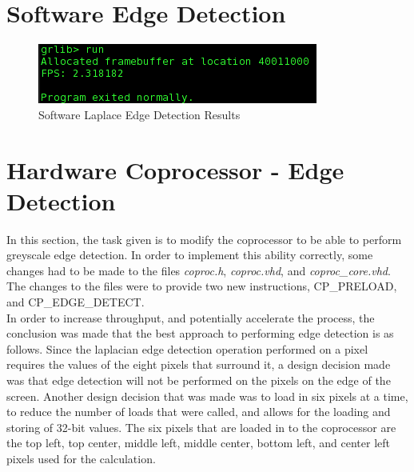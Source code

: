 \documentclass{article}
\begin{document}
\section{Software Edge Detection}

	 \begin{figure}[H]
	 	\begin{center}
	 		\includegraphics[scale=0.6]{../part6_files/Software_Laplace_edge_software_performance.png}
	 		\caption{Software Laplace Edge Detection Results}
	 	\end{center}
	 \end{figure}


\section{Hardware Coprocessor - Edge Detection}
In this section, the task given is to modify the coprocessor to be able to perform greyscale edge detection. In order to implement this ability correctly, some changes had to be made to the files \textit{coproc.h}, \textit{coproc.vhd}, and \textit{coproc\_core.vhd}. The changes to the files were to provide two new instructions, CP\_PRELOAD, and CP\_EDGE\_DETECT.\\
In order to increase throughput, and potentially accelerate the process, the conclusion was made that the best approach to performing edge detection is as follows. Since the laplacian edge detection operation performed on a pixel requires the values of the eight pixels that surround it, a design decision made was that edge detection will not be performed on the pixels on the edge of the screen. Another design decision that was made was to load in six pixels at a time, to reduce the number of loads that were called, and allows for the loading and storing of 32-bit values. The six pixels that are loaded in to the coprocessor are the top left, top center, middle left, middle center, bottom left, and center left pixels used for the calculation. 
\end{document}
